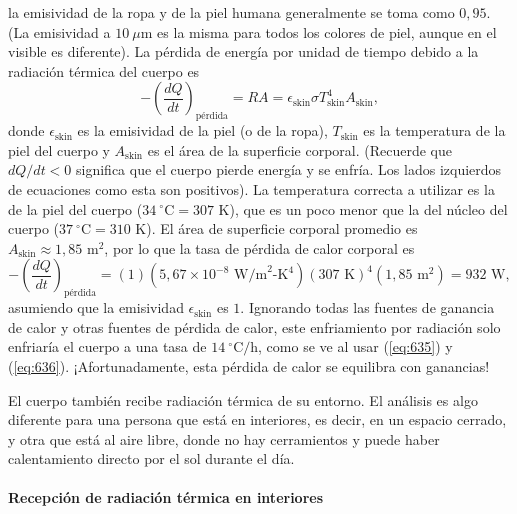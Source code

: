 \documentclass[12pt]{book}
\begin{document}
la emisividad de la ropa y de la piel humana generalmente se toma como $0{,}95$. (La emisividad a $10\ \mu\text{m}$ es la misma para todos los colores de piel, aunque en el visible es diferente). La pérdida de energía por unidad de tiempo debido a la radiación térmica del cuerpo es
\begin{equation}
-\left(\frac{dQ}{dt}\right)_{\text{pérdida}} = R A = \epsilon_{\text{skin}} \sigma T_{\text{skin}}^4 A_{\text{skin}},
\label{eq:640}
\end{equation}
donde $\epsilon_{\text{skin}}$ es la emisividad de la piel (o de la ropa), $T_{\text{skin}}$ es la temperatura de la piel del cuerpo y $A_{\text{skin}}$ es el área de la superficie corporal. (Recuerde que $dQ/dt < 0$ significa que el cuerpo pierde energía y se enfría. Los lados izquierdos de ecuaciones como esta son positivos). La temperatura correcta a utilizar es la de la piel del cuerpo ($34\ ^\circ\text{C} = 307\text{ K}$), que es un poco menor que la del núcleo del cuerpo ($37\ ^\circ\text{C} = 310\text{ K}$). El área de superficie corporal promedio es $A_{\text{skin}} \approx 1{,}85\text{ m}^2$, por lo que la tasa de pérdida de calor corporal es
\begin{equation}
-\left(\frac{dQ}{dt}\right)_{\text{pérdida}} = (1)(5{,}67 \times 10^{-8}\text{ W/m}^2\text{-K}^4)(307\text{ K})^4(1{,}85\text{ m}^2) = 932\text{ W},
\label{eq:641}
\end{equation}
asumiendo que la emisividad $\epsilon_{\text{skin}}$ es $1$. Ignorando todas las fuentes de ganancia de calor y otras fuentes de pérdida de calor, este enfriamiento por radiación solo enfriaría el cuerpo a una tasa de $14\ ^\circ\text{C/h}$, como se ve al usar (\ref{eq:635}) y (\ref{eq:636}). ¡Afortunadamente, esta pérdida de calor se equilibra con ganancias!

El cuerpo también recibe radiación térmica de su entorno. El análisis es algo diferente para una persona que está en interiores, es decir, en un espacio cerrado, y otra que está al aire libre, donde no hay cerramientos y puede haber calentamiento directo por el sol durante el día.

\paragraph*{Recepción de radiación térmica en interiores}
\end{document}

